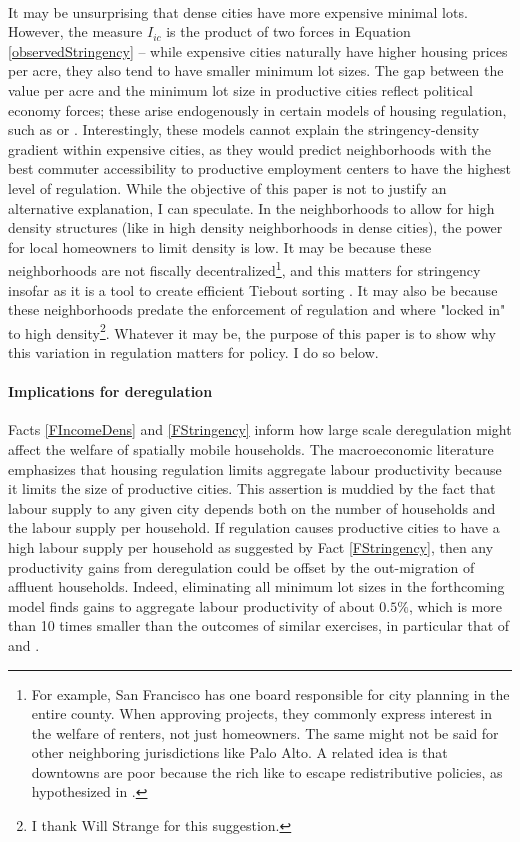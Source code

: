 \documentclass[11pt]{article}
\begin{document}
	\paragraph*{}
	It may be unsurprising that dense cities have more expensive minimal lots. However, the measure $I_{ic}$ is the product of two forces in Equation \eqref{observedStringency} -- while expensive cities naturally have higher housing prices per acre, they also tend to have smaller minimum lot sizes. The gap between the value per acre and the minimum lot size in productive cities reflect political economy forces; these arise endogenously in certain models of housing regulation, such as \cite{parkho} or \cite{HILBER2013}. Interestingly, these models cannot explain the stringency-density gradient within expensive cities, as they would predict neighborhoods with the best commuter accessibility to productive employment centers to have the highest level of regulation. While the objective of this paper is not to justify an alternative explanation, I can speculate. In the neighborhoods to allow for high density structures (like in high density neighborhoods in dense cities), the power for local homeowners to limit density is low. It may be because these neighborhoods are not fiscally decentralized\footnote{For example, San Francisco has one board responsible for city planning in the entire county. When approving projects, they commonly express interest in the welfare of renters, not just homeowners. The same might not be said for other neighboring jurisdictions like Palo Alto. A related idea is that downtowns are poor because the rich like to escape redistributive policies, as hypothesized in \cite{NechybaWalsh}.}, and this matters for stringency insofar as it is a tool to create efficient Tiebout sorting \citep{calabresetal}. It may also be because these neighborhoods predate the enforcement of regulation and where "locked in" to high density\footnote{I thank Will Strange for this suggestion.}. Whatever it may be, the purpose of this paper is to show why this variation in regulation matters for policy. I do so below. 
	
	
	\paragraph*{Implications for deregulation} Facts \ref{FIncomeDens} and \ref{FStringency} inform how large scale deregulation might affect the welfare of spatially mobile households. The macroeconomic literature emphasizes that housing regulation limits aggregate labour productivity because it limits the size of productive cities. This assertion is muddied by the fact that labour supply to any given city depends both on the number of households and the labour supply per household. If regulation causes productive cities to have a high labour supply per household as suggested by Fact \ref{FStringency}, then any productivity gains from deregulation could be offset by the out-migration of affluent households. Indeed, eliminating all minimum lot sizes in the forthcoming model finds gains to aggregate labour productivity of about $0.5 \%$, which is more than 10 times smaller than the outcomes of similar exercises, in particular that of \cite{hseihmoretti} and \cite{durantonpugaurbgrowth}.  
	
\end{document}
